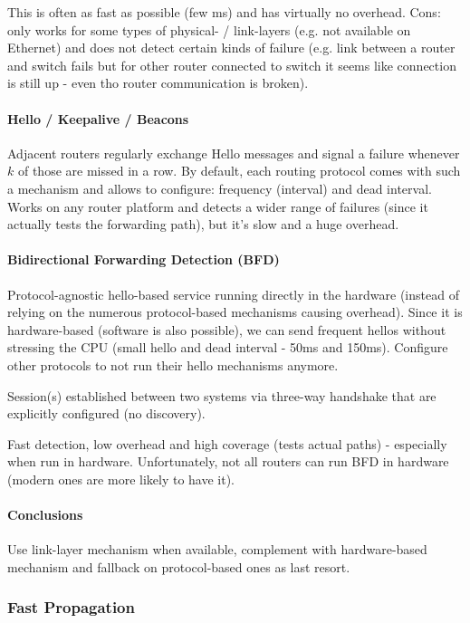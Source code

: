 This is often as fast as possible (few ms) and has virtually no overhead. Cons: only works for some types of physical- / link-layers (e.g. not available on Ethernet) and does not detect certain kinds of failure (e.g. link between a router and switch fails but for other router connected to switch it seems like connection is still up - even tho router communication is broken).



\paragraph{Hello / Keepalive / Beacons}
Adjacent routers regularly exchange Hello messages and signal a failure whenever $k$ of those are missed in a row. By default, each routing protocol comes with such a mechanism and allows to configure: frequency (interval) and dead interval. Works on any router platform and detects a wider range of failures (since it actually tests the forwarding path), but it's slow and a huge overhead.

\paragraph{Bidirectional Forwarding Detection (BFD)}
Protocol-agnostic hello-based service running directly in the hardware (instead of relying on the numerous protocol-based mechanisms causing overhead). Since it is hardware-based (software is also possible), we can send frequent hellos without stressing the CPU (small hello and dead interval - 50ms and 150ms). Configure other protocols to not run their hello mechanisms anymore.

Session(s) established between two systems via three-way handshake that are explicitly configured (no discovery).

Fast detection, low overhead and high coverage (tests actual paths) - especially when run in hardware. Unfortunately, not all routers can run BFD in hardware (modern ones are more likely to have it).

\paragraph{Conclusions}
Use link-layer mechanism when available, complement with hardware-based mechanism and fallback on protocol-based ones as last resort.


\subsubsection{Fast Propagation}

